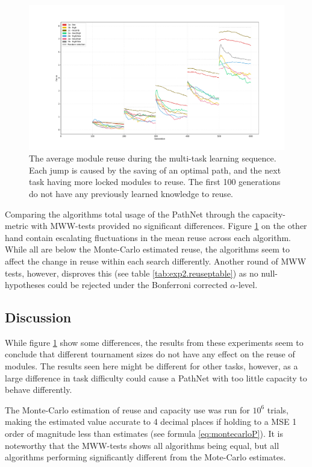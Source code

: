 \begin{figure}
    \includegraphics[width=1.2\textwidth,center]{Chapters/4.Experiments/exp2/figures/large/Module_reuse_pr_generation.pdf}
    \caption[Module reuse plot]{The average module reuse during the multi-task learning sequence. Each jump is caused by the saving of an optimal path, and the next task having more locked modules to reuse. The first 100 generations do not have any previously learned knowledge to reuse.}
    \label{fig:search.reuse}
\end{figure}

Comparing the algorithms total usage of the PathNet through the capacity-metric with MWW-tests provided no significant differences. Figure \ref{fig:search.reuse} on the other hand contain escalating fluctuations in the mean reuse across each algorithm. While all are below the Monte-Carlo estimated reuse, the algorithms seem to affect the change in reuse within each search differently. Another round of MWW tests, however, disproves this (see table \ref{tab:exp2.reuseptable}) as no null-hypotheses could be rejected under the Bonferroni corrected \(\alpha\)-level.

\subsection{Discussion}
While figure \ref{fig:search.reuse} show some differences, the results from these experiments seem to conclude that different tournament sizes do not have any effect on the reuse of modules. The results seen here might be different for other tasks, however, as a large difference in task difficulty could cause a PathNet with too little capacity to behave differently.

The Monte-Carlo estimation of reuse and capacity use was run for \(10^{6}\) trials, making the estimated value accurate to 4 decimal places if holding to a MSE 1 order of magnitude less than estimates (see formula \ref{eq:montecarloP}). It is noteworthy that the MWW-tests shows all algorithms being equal, but all algorithms performing significantly different from the Mote-Carlo estimates. 

